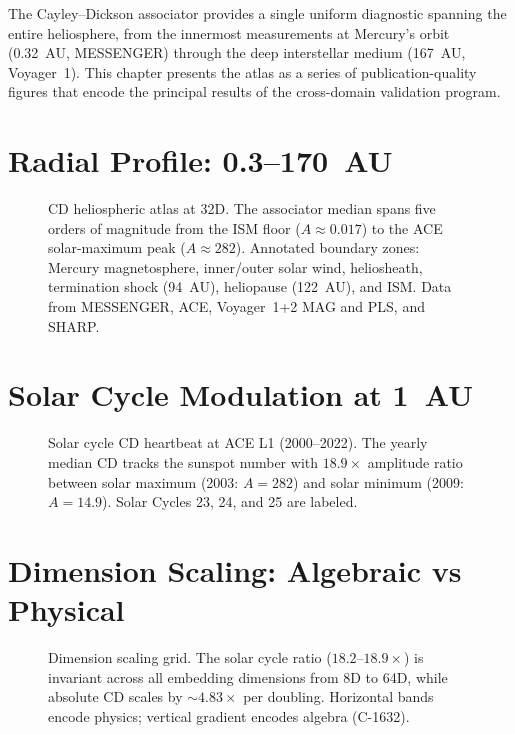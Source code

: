 \documentclass[12pt,openany]{report}
\theoremstyle{definition}
\theoremstyle{plain}
\theoremstyle{remark}
\begin{document}
The Cayley--Dickson associator provides a single uniform diagnostic spanning
the entire heliosphere, from the innermost measurements at Mercury's orbit
(0.32~AU, MESSENGER) through the deep interstellar medium (167~AU, Voyager~1).
This chapter presents the atlas as a series of publication-quality figures
that encode the principal results of the cross-domain validation program.

\section{Radial Profile: 0.3--170~AU}

\begin{figure}[htbp]
\centering
\resizebox{\textwidth}{!}{}
\caption{CD heliospheric atlas at 32D.
The associator median spans five orders of magnitude from the ISM floor
($A \approx 0.017$) to the ACE solar-maximum peak ($A \approx 282$).
Annotated boundary zones: Mercury magnetosphere, inner/outer solar wind,
heliosheath, termination shock (94~AU), heliopause (122~AU), and ISM.
Data from MESSENGER, ACE, Voyager~1+2 MAG and PLS, and SHARP.}
\label{fig:heliospheric-atlas}
\end{figure}

\section{Solar Cycle Modulation at 1~AU}

\begin{figure}[htbp]
\centering
\resizebox{\textwidth}{!}{}
\caption{Solar cycle CD heartbeat at ACE L1 (2000--2022).
The yearly median CD tracks the sunspot number with $18.9\times$ amplitude
ratio between solar maximum (2003: $A = 282$) and solar minimum
(2009: $A = 14.9$).  Solar Cycles 23, 24, and 25 are labeled.}
\label{fig:solar-cycle}
\end{figure}

\section{Dimension Scaling: Algebraic vs Physical}

\begin{figure}[htbp]
\centering
\resizebox{0.85\textwidth}{!}{}
\caption{Dimension scaling grid.
The solar cycle ratio ($18.2$--$18.9\times$) is invariant across all
embedding dimensions from 8D to 64D, while absolute CD scales by
$\sim 4.83\times$ per doubling.  Horizontal bands encode physics;
vertical gradient encodes algebra (C-1632).}
\label{fig:dim-scaling}
\end{figure}
\end{document}
